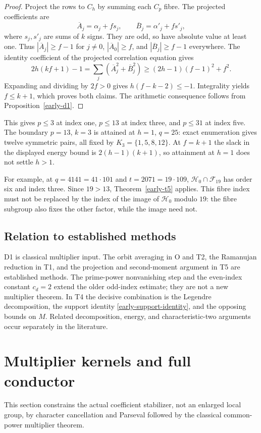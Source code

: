 \documentclass[11pt]{article}
\theoremstyle{definition}
\theoremstyle{remark}
\begin{document}
\begin{proof}
Project the rows to $C_h$ by summing each $C_p$ fibre. The projected
coefficients are
\[
 \overline A_j=\alpha_j+fs_j,\qquad
 \overline B_j=\alpha'_j+fs'_j,
\]
where $s_j,s'_j$ are sums of $k$ signs. They are odd, so have absolute
value at least one. Thus $|\overline A_j|\geq f-1$ for $j\ne0$,
$|\overline A_0|\geq f$, and $|\overline B_j|\geq f-1$ everywhere.
The identity coefficient of the projected correlation equation gives
\[
 2h(kf+1)-1
 =\sum_j(\overline A_j^2+\overline B_j^2)
 \geq(2h-1)(f-1)^2+f^2.
\]
Expanding and dividing by $2f>0$ gives $h(f-k-2)\leq-1$. Integrality
yields $f\leq k+1$, which proves both claims. The arithmetic consequence
follows from Proposition~\ref{early-d1}.
\end{proof}

This gives $p\leq3$ at index one, $p\leq13$ at index three, and
$p\leq31$ at index five. The boundary $p=13$, $k=3$ is attained at
$h=1$, $q=25$: exact enumeration gives twelve symmetric pairs, all fixed
by $K_3=\{1,5,8,12\}$. At $f=k+1$ the slack in the displayed energy bound
is $2(h-1)(k+1)$, so attainment at $h=1$ does not settle $h>1$.

For example, at $q=4141=41\cdot101$ and $t=2071=19\cdot109$,
$\mathcal H_0\cap\mathcal F_{19}$ has order six and index three. Since
$19>13$, Theorem~\ref{early-t5} applies. This fibre index must not be
replaced by the index of the image of $\mathcal H_0$ modulo $19$: the
fibre subgroup also fixes the other factor, while the image need not.

\subsection{Relation to established methods}
\label{early-novelty-scope}

D1 is classical multiplier input. The orbit averaging in O and T2, the
Ramanujan reduction in T1, and the projection and second-moment argument
in T5 are established methods. The prime-power nonvanishing step and the
even-index constant $c_d=2$ extend the older odd-index estimate; they are
not a new multiplier theorem. In T4 the decisive combination is the
Legendre decomposition, the support identity
\eqref{early-support-identity}, and the opposing bounds on $M$. Related
decomposition, energy, and characteristic-two arguments occur separately
in the literature.

\section{Multiplier kernels and full conductor}\label{sec:conductor}
This section constrains the actual coefficient stabilizer, not an enlarged
local group, by character cancellation and Parseval followed by the
classical common-power multiplier theorem.
\end{document}
